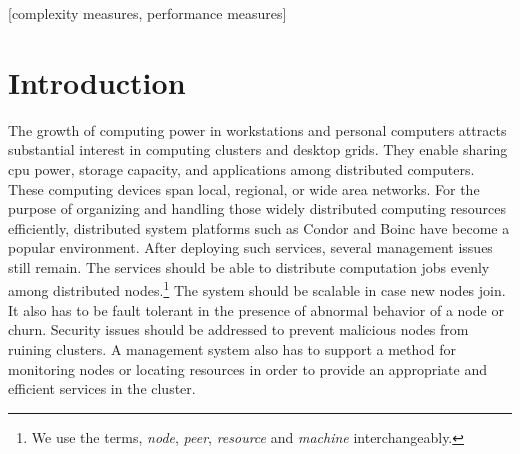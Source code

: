 \documentclass{acm_proc_article-sp}
\begin{document}
[complexity measures, performance measures]



\section{Introduction}
The growth of computing power in workstations and personal computers attracts substantial interest in computing clusters and desktop grids\cite{bonic}\cite{condor}. 
They enable sharing cpu power, storage capacity, and applications among distributed computers. 
These computing devices span local, regional, or wide area networks.
For the purpose of organizing and handling those widely distributed computing resources efficiently, distributed system platforms such as Condor\cite{condor} and Boinc\cite{bonic} have become a popular environment.
After deploying such services, several management issues still remain. The services should be able to distribute computation jobs evenly among distributed nodes.\footnote{We use the terms, \textit{node}, \textit{peer}, \textit{resource} and \textit{machine} interchangeably.}
The system should be scalable in case new nodes join. It also has to be fault tolerant in the presence of abnormal behavior of a node or churn. 
Security issues should be addressed to prevent malicious nodes from ruining clusters.
A management system also has to support a method for monitoring nodes or locating resources in order to provide an appropriate and efficient services in the cluster.
\end{document}
